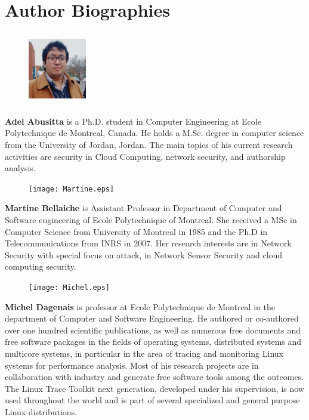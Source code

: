 \documentclass[preprint]{elsarticle}
\theoremstyle{definition}
\theoremstyle{remark}
\theoremstyle{property}
\begin{document}
\section*{Author Biographies}
 \begin{figure}
    \includegraphics[width=1in,height=1.25in,clip,keepaspectratio]{Adel.eps}
  \end{figure}\par
\textbf{Adel Abusitta} is a Ph.D. student in Computer Engineering at Ecole Polytechnique de Montreal, Canada. He holds a M.Sc. degree in computer science from the University of Jordan, Jordan. The main topics of his current research activities are security in Cloud Computing, network security, and authorship analysis.\par\par
\vspace{25 mm}
\begin{figure}
     \vspace{-35 mm}
    \texttt{[image: Martine.eps]}
  \end{figure}\par
\textbf{Martine Bellaiche} is Assistant Professor in Department of Computer and Software engineering of Ecole Polytechnique of Montreal. She received a MSc in Computer Science from University of Montreal in 1985 and the Ph.D in Telecommunications from INRS in 2007. Her research interests are in Network Security with special focus on attack, in Network Sensor Security and cloud computing security.\par
\begin{figure}
    \texttt{[image: Michel.eps]}
  \end{figure}\par
\textbf{Michel Dagenais} is professor at Ecole Polytechnique de Montreal in the department of Computer and Software Engineering. He authored or co-authored over one hundred scientific publications, as well as numerous free documents and free software packages in the fields of operating systems, distributed systems and multicore systems, in particular in the area of tracing and monitoring Linux systems for performance analysis. Most of his research projects are in collaboration with industry and generate free software tools among the outcomes. The Linux Trace Toolkit next generation, developed under his supervision, is now used throughout the world and is part of several specialized and general purpose Linux distributions.
\end{document}
